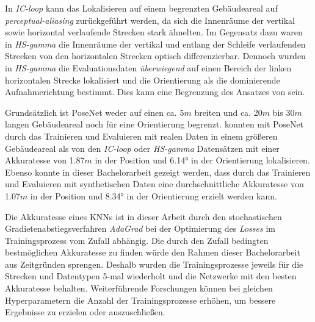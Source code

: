 In \textit{IC-loop} kann das Lokalisieren auf einem begrenzten Gebäudeareal auf \textit{perceptual-aliasing} zurückgeführt werden, da sich die Innenräume der vertikal sowie horizontal verlaufende Strecken stark ähnelten. Im Gegensatz dazu waren in \textit{HS-gamma} die Innenräume der vertikal und entlang der Schleife verlaufenden Strecken von den horizontalen Strecken optisch differenzierbar. Dennoch wurden in \textit{HS-gamma} die Evaluationsdaten \textit{überwiegend} auf einen Bereich der linken horizontalen Strecke lokalisiert und die Orientierung als die dominierende Aufnahmerichtung bestimmt. Dies kann eine Begrenzung des Ansatzes von \citet{acharyaBIMPoseNetIndoorCamera2019} sein.

Grundsätzlich ist PoseNet weder auf einen ca. 5$m$ breiten und ca. 20$m$ bis 30$m$ langen Gebäudeareal noch für eine Orientierung begrenzt. \citet{walchImageBasedLocalizationUsing2017} konnten mit PoseNet durch das Trainieren und Evaluieren mit realen Daten in einem größeren Gebäudeareal als von den \textit{IC-loop} oder \textit{HS-gamma} Datensätzen mit einer Akkuratesse von 1.87$m$ in der Position und 6.14° in der Orientierung lokalisieren. Ebenso konnte in dieser Bachelorarbeit gezeigt werden, dass durch das Trainieren und Evaluieren mit synthetischen Daten eine durchschnittliche Akkuratesse von 1.07$m$ in der Position und 8.34° in der Orientierung erzielt werden kann.








Die Akkuratesse eines KNNs ist in dieser Arbeit durch den stochastischen Gradietenabstiegsverfahren \textit{AdaGrad} bei der Optimierung des \textit{Losses} im Trainingsprozess vom Zufall abhängig. Die durch den Zufall bedingten bestmöglichen Akkuratesse zu finden würde den Rahmen dieser Bachelorarbeit aus Zeitgründen sprengen. Deshalb wurden die Trainingsprozesse jeweils für die Strecken und Datentypen 5-mal wiederholt und die Netzwerke mit den besten Akkuratesse behalten. Weiterführende Forschungen können bei gleichen Hyperparametern die Anzahl der Trainingsprozesse erhöhen, um bessere Ergebnisse zu erzielen oder auszuschließen. 


